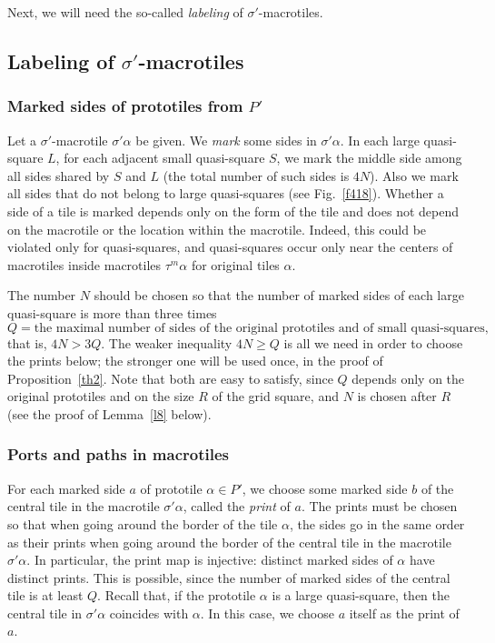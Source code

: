 \documentclass[12pt]{article}
\theoremstyle{remark}
\begin{document}
Next, we will need
the so-called \emph{labeling} of $\sigma'$-macrotiles.


\subsection{Labeling of $\sigma'$-macrotiles}

\subsubsection{Marked sides of prototiles from $P'$}\label{smarked}

Let a $\sigma'$-macrotile $\sigma'\alpha$ be given.
We
\emph{mark} some sides in $\sigma'\alpha$.
In each large quasi-square $L$, for each adjacent small quasi-square $S$, we mark
the middle side among all sides shared by $S$ and $L$  (the total number of such sides is  $4N$).
Also we mark all sides that do not belong to 
large quasi-squares (see Fig.~\ref{f418}). Whether a side of a tile is marked depends only
on the form of the tile and does not depend on the macrotile or the location within the macrotile.
Indeed, this could be violated only for quasi-squares, and quasi-squares occur
only near the centers of macrotiles inside macrotiles $\tau^m\alpha$ for original tiles $\alpha$. 

The number $N$ should  be chosen so
that the number
of marked sides of each large quasi-square is more than three times
$$
Q=\text{the maximal number
of sides of the original prototiles and of small quasi-squares},
$$
that is, $4N>3Q$. The weaker inequality $4N\ge Q$ is all we need in order to choose the prints
below; the stronger one will be used once, in the proof of Proposition~\ref{th2}. Note that both
are easy to satisfy, since $Q$ depends only on the original prototiles and on the size $R$ of the
grid square, and $N$ is chosen after $R$ (see the proof of Lemma~\ref{l8} below).

\subsubsection{Ports and paths in macrotiles}

For each marked side $a$ of prototile $\alpha\in P'$, we choose some marked side $b$ of the central tile
in the macrotile $\sigma'\alpha$, called the \emph{print} of $a$.
The prints must be chosen so that when going around the border of the tile $\alpha$, the sides go in the same order as their prints when going around the border of the central tile in the macrotile $\sigma'\alpha$.
In particular, the print map is injective: distinct marked sides of $\alpha$ have distinct prints.
This is possible, since the number of marked sides of the central tile is at least $Q$.
 Recall that, 
if the prototile $\alpha$ is a large quasi-square, then the central tile in $\sigma'\alpha$ coincides with $\alpha$. In this case, we choose $a$ itself as the print of $a$.
\end{document}
